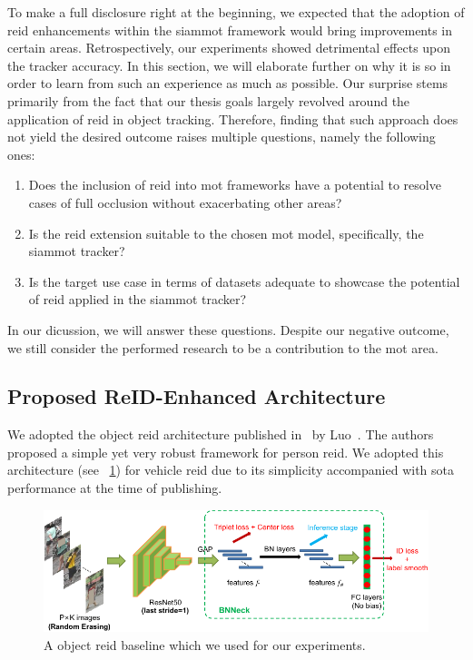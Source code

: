 To make a full disclosure right at the beginning, we expected that the adoption of \gls{reid} enhancements within the \gls{siammot} framework would bring improvements in certain areas. Retrospectively, our experiments showed detrimental effects upon the tracker accuracy. In this section, we will elaborate further on why it is so in order to learn from such an experience as much as possible. Our surprise stems primarily from the fact that our thesis goals largely revolved around the application of \gls{reid} in object tracking. Therefore, finding that such approach does not yield the desired outcome raises multiple questions, namely the following ones:
\begin{enumerate}
    \item Does the inclusion of \gls{reid} into \gls{mot} frameworks have a potential to resolve cases of full occlusion without exacerbating other areas?
    \item Is the \gls{reid} extension suitable to the chosen \gls{mot} model, specifically, the \gls{siammot} tracker?
    \item Is the target use case in terms of datasets adequate to showcase the potential of \gls{reid} applied in the \gls{siammot} tracker?
\end{enumerate}
In our dicussion, we will answer these questions. Despite our negative outcome, we still consider the performed research to be a contribution to the \gls{mot} area.

\subsection{Proposed ReID-Enhanced Architecture}
\label{ssec:ProposedReIDEnhancedArchitecture}

We adopted the object \gls{reid} architecture published in~\cite{luo2019bagoftricksreid} by Luo~\etal{}. The authors proposed a simple yet very robust framework for person \gls{reid}. We adopted this architecture (see \figtext{}~\ref{fig:BagOfTricksReIDArchitecture}) for vehicle \gls{reid} due to its simplicity accompanied with \gls{sota} performance at the time of publishing.

\begin{figure}[!t]
    \centering
    \includegraphics[width=\linewidth]{figures/siamese_tracking/bagoftricks_reid_architecture.pdf}
    \caption[Gls{reid} baseline]{A object \gls{reid} baseline which we used for our experiments. }
    \label{fig:BagOfTricksReIDArchitecture}
\end{figure}

